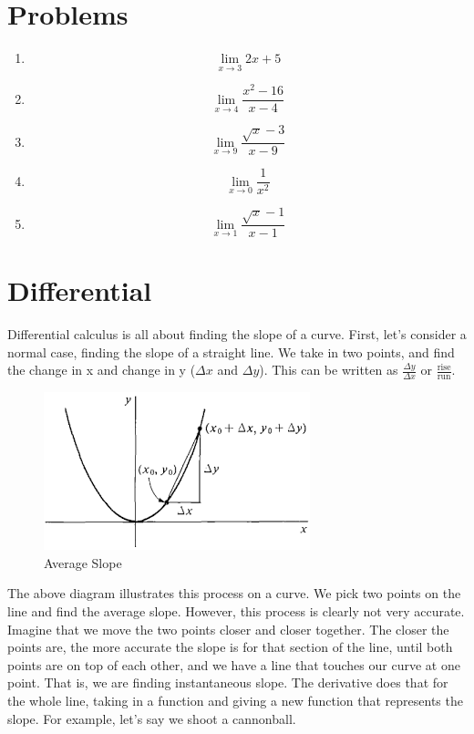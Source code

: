 \documentclass{memoir}
\begin{document}
\section{Problems}
\begin{enumerate}
    \item $$\lim\limits_{x\rightarrow 3} 2x+5$$
    \item $$\lim\limits_{x\rightarrow 4} \frac{x^2-16}{x-4}$$
    \item $$\lim\limits_{x\rightarrow 9} \frac{\sqrt{x}-3}{x-9}$$
    \item $$\lim\limits_{x\rightarrow 0} \frac{1}{x^2}$$
    \item $$\lim\limits_{x\rightarrow 1} \frac{\sqrt{x}-1}{x-1}$$
\end{enumerate}

\section{Differential}

Differential calculus is all about finding the slope of a curve. 
First, let's consider a normal case, finding the slope of a straight line. 
We take in two points, and find the change in x and change in y ($\Delta x$ and $\Delta y$). 
This can be written as $\frac{\Delta y}{\Delta x}$ or $\frac{\text{rise}}{\text{run}}$.

\begin{figure}[H]
\caption{Average Slope}
\includegraphics[scale=1]{../download.png}
\end{figure}

The above diagram illustrates this process on a curve. 
We pick two points on the line and find the average slope. 
However, this process is clearly not very accurate. 
Imagine that we move the two points closer and closer together. 
The closer the points are, the more accurate the slope is for that section of the line, until both points are on top of each other, and we have a line that touches our curve at one point.
That is, we are finding instantaneous slope.
The derivative does that for the whole line, taking in a function and giving a new function that represents the slope. 
For example, let's say we shoot a cannonball.
\end{document}
